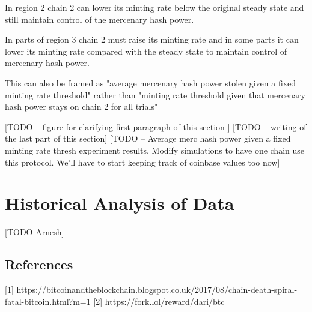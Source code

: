 \documentclass[10pt, preprint]{aastex}
\begin{document}
In region 2 chain 2 can lower its minting rate below the original steady state and still maintain control of the mercenary hash power.

In parts of region 3 chain 2 must raise its minting rate and in some parts it can lower its minting rate compared with the steady state to maintain control of mercenary hash power.

This can also be framed as "average mercenary hash power stolen given a fixed minting rate threshold" rather than "minting rate threshold given that mercenary hash power stays on chain 2 for all trials"

[TODO -- figure for clarifying first paragraph of this section ]
[TODO -- writing of the last part of this section]
[TODO -- Average merc hash power given a fixed minting rate thresh experiment results.  Modify simulations to have one chain use this protocol.  We'll have to start keeping track of coinbase values too now]


\section{Historical Analysis of Data}
[TODO Arnesh]



\subsection{References}
[1] https://bitcoinandtheblockchain.blogspot.co.uk/2017/08/chain-death-spiral-fatal-bitcoin.html?m=1
[2] https://fork.lol/reward/dari/btc
\end{document}
